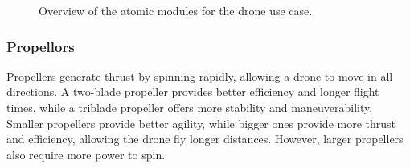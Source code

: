 \documentclass[sigconf,review]{acmart}
\begin{document}
\begin{figure}[htbp]
    \hfill
    \hfill
    \hfill
    \hfill

    \caption{Overview of the atomic modules for the drone use case.}
    \label{fig:atomic-modules}
\end{figure}

\subsubsection{Propellors}
\label{sec:propellors}

Propellers generate thrust by spinning rapidly, allowing a drone to move in all directions. 
A two-blade propeller provides better efficiency and longer flight times, while a triblade propeller offers more stability and maneuverability. 
Smaller propellers provide better agility, while bigger ones provide more thrust and efficiency, allowing the drone fly longer distances. 
However, larger propellers also require more power to spin.
\end{document}
